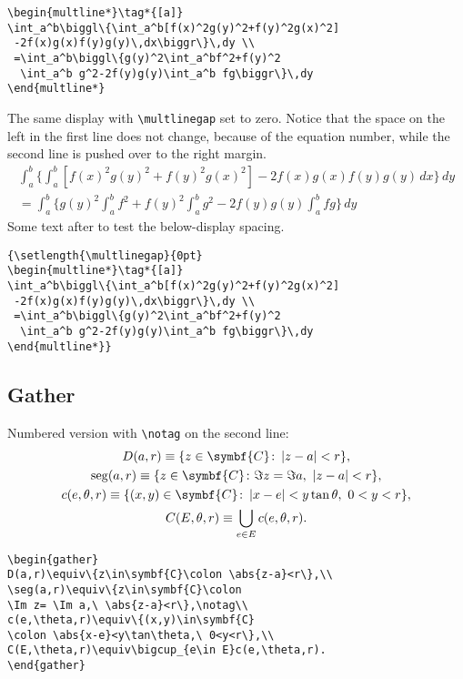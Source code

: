 \documentclass{article}
\theoremstyle{definition}
\theoremstyle{remark}
\DeclareMathOperator{\seg}{seg}
\newcommand{\envert}[1]{\left\lvert#1\right\rvert}
\let\abs=\envert
\begin{document}
\begin{verbatim}
\begin{multline*}\tag*{[a]}
\int_a^b\biggl\{\int_a^b[f(x)^2g(y)^2+f(y)^2g(x)^2]
 -2f(x)g(x)f(y)g(y)\,dx\biggr\}\,dy \\
 =\int_a^b\biggl\{g(y)^2\int_a^bf^2+f(y)^2
  \int_a^b g^2-2f(y)g(y)\int_a^b fg\biggr\}\,dy
\end{multline*}
\end{verbatim}


The same display with \verb=\multlinegap= set to zero.
Notice that the space on the left in
the first line does not change, because of the equation number, while
the second line is pushed over to the right margin.
{\setlength{\multlinegap}{0pt}
\begin{multline*}\tag*{[a]}
\int_a^b\biggl\{\int_a^b[f(x)^2g(y)^2+f(y)^2g(x)^2]
 -2f(x)g(x)f(y)g(y)\,dx\biggr\}\,dy \\
 =\int_a^b\biggl\{g(y)^2\int_a^bf^2+f(y)^2
  \int_a^b g^2-2f(y)g(y)\int_a^b fg\biggr\}\,dy
\end{multline*}}%
Some text after to test the below-display spacing.

\begin{verbatim}
{\setlength{\multlinegap}{0pt}
\begin{multline*}\tag*{[a]}
\int_a^b\biggl\{\int_a^b[f(x)^2g(y)^2+f(y)^2g(x)^2]
 -2f(x)g(x)f(y)g(y)\,dx\biggr\}\,dy \\
 =\int_a^b\biggl\{g(y)^2\int_a^bf^2+f(y)^2
  \int_a^b g^2-2f(y)g(y)\int_a^b fg\biggr\}\,dy
\end{multline*}}
\end{verbatim}
\fi %


\newpage
\subsection{Gather}
Numbered version with \verb;\notag; on the second line:
\begin{gather}
D(a,r)\equiv\{z\in\symbf{C}\colon \abs{z-a}<r\},\\
\seg(a,r)\equiv\{z\in\symbf{C}\colon
\Im z= \Im a,\ \abs{z-a}<r\},\notag\\
c(e,\theta,r)\equiv\{(x,y)\in\symbf{C}
\colon \abs{x-e}<y\tan\theta,\ 0<y<r\},\\
C(E,\theta,r)\equiv\bigcup_{e\in E}c(e,\theta,r).
\end{gather}
\begin{verbatim}
\begin{gather}
D(a,r)\equiv\{z\in\symbf{C}\colon \abs{z-a}<r\},\\
\seg(a,r)\equiv\{z\in\symbf{C}\colon
\Im z= \Im a,\ \abs{z-a}<r\},\notag\\
c(e,\theta,r)\equiv\{(x,y)\in\symbf{C}
\colon \abs{x-e}<y\tan\theta,\ 0<y<r\},\\
C(E,\theta,r)\equiv\bigcup_{e\in E}c(e,\theta,r).
\end{gather}
\end{verbatim}
\end{document}
